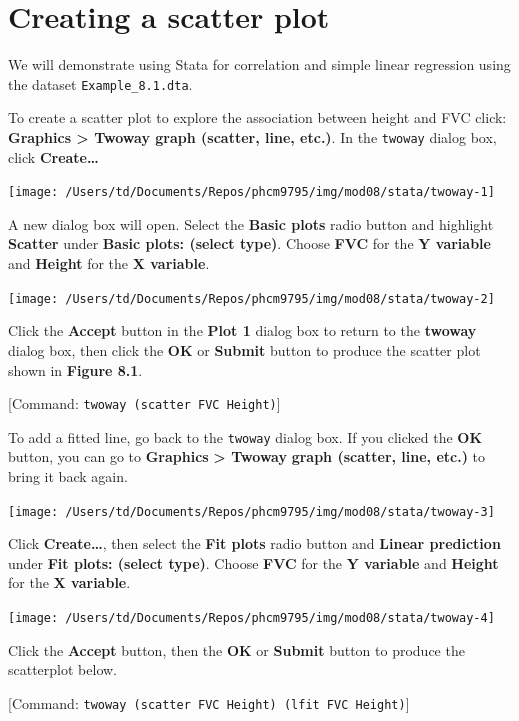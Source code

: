 \documentclass[
]{memoir}
\begin{document}
\hypertarget{creating-a-scatter-plot}{%
\section{Creating a scatter plot}\label{creating-a-scatter-plot}}

We will demonstrate using Stata for correlation and simple linear regression using the dataset \texttt{Example\_8.1.dta}.

To create a scatter plot to explore the association between height and FVC click: \textbf{Graphics \textgreater{} Twoway graph (scatter, line, etc.)}. In the \texttt{twoway} dialog box, click \textbf{Create\ldots{}}

\texttt{[image: /Users/td/Documents/Repos/phcm9795/img/mod08/stata/twoway-1]}

A new dialog box will open. Select the \textbf{Basic plots} radio button and highlight \textbf{Scatter} under \textbf{Basic plots: (select type)}. Choose \textbf{FVC} for the \textbf{Y variable} and \textbf{Height} for the \textbf{X variable}.

\texttt{[image: /Users/td/Documents/Repos/phcm9795/img/mod08/stata/twoway-2]}

Click the \textbf{Accept} button in the \textbf{Plot 1} dialog box to return to the \textbf{twoway} dialog box, then click the \textbf{OK} or \textbf{Submit} button to produce the scatter plot shown in \textbf{Figure 8.1}.

{[}Command: \texttt{twoway\ (scatter\ FVC\ Height)}{]}

To add a fitted line, go back to the \texttt{twoway} dialog box. If you clicked the \textbf{OK} button, you can go to \textbf{Graphics} \textbf{\textgreater{} Twoway} \textbf{graph (scatter, line, etc.)} to bring it back again.

\texttt{[image: /Users/td/Documents/Repos/phcm9795/img/mod08/stata/twoway-3]}

Click \textbf{Create\ldots{}}, then select the \textbf{Fit plots} radio button and \textbf{Linear prediction} under \textbf{Fit plots: (select type)}. Choose \textbf{FVC} for the \textbf{Y variable} and \textbf{Height} for the \textbf{X variable}.

\texttt{[image: /Users/td/Documents/Repos/phcm9795/img/mod08/stata/twoway-4]}

Click the \textbf{Accept} button, then the \textbf{OK} or \textbf{Submit} button to produce the scatterplot below.

{[}Command: \texttt{twoway\ (scatter\ FVC\ Height)\ (lfit\ FVC\ Height)}{]}
\end{document}
